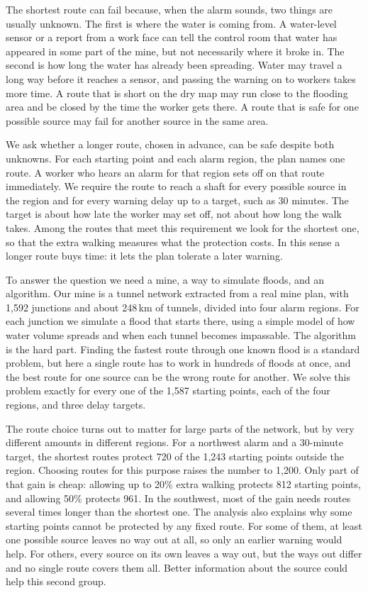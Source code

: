 \documentclass[11pt,a4paper]{article}
\begin{document}
The shortest route can fail because, when the alarm sounds, two things are usually unknown. The first is where the water is coming from. A water-level sensor or a report from a work face can tell the control room that water has appeared in some part of the mine, but not necessarily where it broke in. The second is how long the water has already been spreading. Water may travel a long way before it reaches a sensor, and passing the warning on to workers takes more time. A route that is short on the dry map may run close to the flooding area and be closed by the time the worker gets there. A route that is safe for one possible source may fail for another source in the same area.

We ask whether a longer route, chosen in advance, can be safe despite both unknowns. For each starting point and each alarm region, the plan names one route. A worker who hears an alarm for that region sets off on that route immediately. We require the route to reach a shaft for every possible source in the region and for every warning delay up to a target, such as 30 minutes. The target is about how late the worker may set off, not about how long the walk takes. Among the routes that meet this requirement we look for the shortest one, so that the extra walking measures what the protection costs. In this sense a longer route buys time: it lets the plan tolerate a later warning.

To answer the question we need a mine, a way to simulate floods, and an algorithm. Our mine is a tunnel network extracted from a real mine plan, with 1,592 junctions and about 248\,km of tunnels, divided into four alarm regions. For each junction we simulate a flood that starts there, using a simple model of how water volume spreads and when each tunnel becomes impassable. The algorithm is the hard part. Finding the fastest route through one known flood is a standard problem, but here a single route has to work in hundreds of floods at once, and the best route for one source can be the wrong route for another. We solve this problem exactly for every one of the 1,587 starting points, each of the four regions, and three delay targets.

The route choice turns out to matter for large parts of the network, but by very different amounts in different regions. For a northwest alarm and a 30-minute target, the shortest routes protect 720 of the 1,243 starting points outside the region. Choosing routes for this purpose raises the number to 1,200. Only part of that gain is cheap: allowing up to 20\% extra walking protects 812 starting points, and allowing 50\% protects 961. In the southwest, most of the gain needs routes several times longer than the shortest one. The analysis also explains why some starting points cannot be protected by any fixed route. For some of them, at least one possible source leaves no way out at all, so only an earlier warning would help. For others, every source on its own leaves a way out, but the ways out differ and no single route covers them all. Better information about the source could help this second group.
\end{document}
